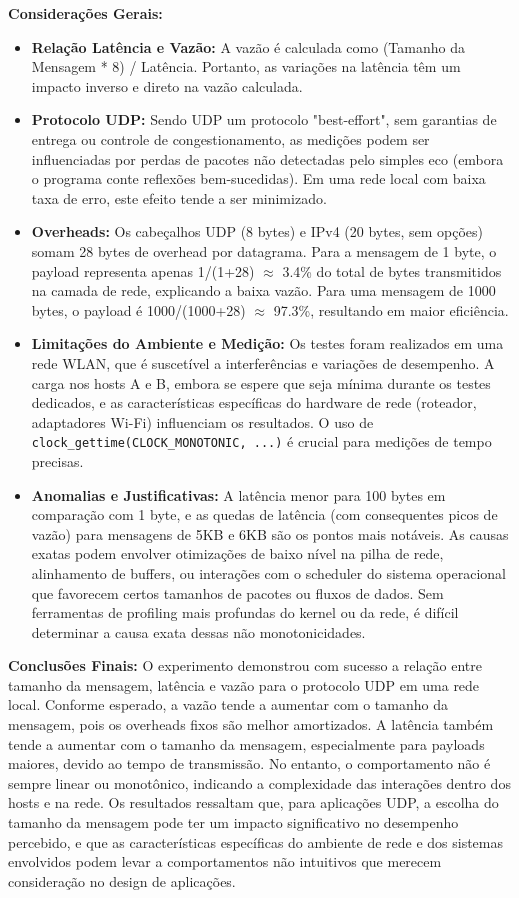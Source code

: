 \textbf{Considerações Gerais:}
\begin{itemize}
    \item \textbf{Relação Latência e Vazão:} A vazão é calculada como (Tamanho da Mensagem * 8) / Latência. Portanto, as variações na latência têm um impacto inverso e direto na vazão calculada.
    \item \textbf{Protocolo UDP:} Sendo UDP um protocolo "best-effort", sem garantias de entrega ou controle de congestionamento, as medições podem ser influenciadas por perdas de pacotes não detectadas pelo simples eco (embora o programa conte reflexões bem-sucedidas). Em uma rede local com baixa taxa de erro, este efeito tende a ser minimizado.
    \item \textbf{Overheads:} Os cabeçalhos UDP (8 bytes) e IPv4 (20 bytes, sem opções) somam 28 bytes de overhead por datagrama. Para a mensagem de 1 byte, o payload representa apenas 1/(1+28) $\approx$ 3.4\% do total de bytes transmitidos na camada de rede, explicando a baixa vazão. Para uma mensagem de 1000 bytes, o payload é 1000/(1000+28) $\approx$ 97.3\%, resultando em maior eficiência.
    \item \textbf{Limitações do Ambiente e Medição:} Os testes foram realizados em uma rede WLAN, que é suscetível a interferências e variações de desempenho. A carga nos hosts A e B, embora se espere que seja mínima durante os testes dedicados, e as características específicas do hardware de rede (roteador, adaptadores Wi-Fi) influenciam os resultados. O uso de \texttt{clock\_gettime(CLOCK\_MONOTONIC, ...)} é crucial para medições de tempo precisas.
    \item \textbf{Anomalias e Justificativas:} A latência menor para 100 bytes em comparação com 1 byte, e as quedas de latência (com consequentes picos de vazão) para mensagens de 5KB e 6KB são os pontos mais notáveis. As causas exatas podem envolver otimizações de baixo nível na pilha de rede, alinhamento de buffers, ou interações com o scheduler do sistema operacional que favorecem certos tamanhos de pacotes ou fluxos de dados. Sem ferramentas de profiling mais profundas do kernel ou da rede, é difícil determinar a causa exata dessas não monotonicidades.
\end{itemize}

\textbf{Conclusões Finais:}
O experimento demonstrou com sucesso a relação entre tamanho da mensagem, latência e vazão para o protocolo UDP em uma rede local. Conforme esperado, a vazão tende a aumentar com o tamanho da mensagem, pois os overheads fixos são melhor amortizados. A latência também tende a aumentar com o tamanho da mensagem, especialmente para payloads maiores, devido ao tempo de transmissão. No entanto, o comportamento não é sempre linear ou monotônico, indicando a complexidade das interações dentro dos hosts e na rede. Os resultados ressaltam que, para aplicações UDP, a escolha do tamanho da mensagem pode ter um impacto significativo no desempenho percebido, e que as características específicas do ambiente de rede e dos sistemas envolvidos podem levar a comportamentos não intuitivos que merecem consideração no design de aplicações.